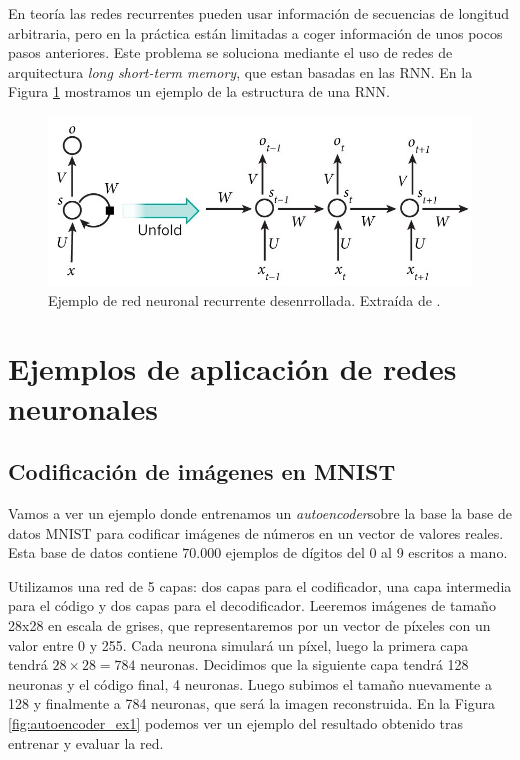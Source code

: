 \documentclass[
  a4paper,
  12pt,
  spanish,
]{scrartcl}
\theoremstyle{teorema-style}
\begin{document}
En teoría las redes recurrentes pueden usar información de secuencias de longitud arbitraria, pero en la práctica están limitadas a coger información de unos pocos pasos anteriores. Este problema se soluciona mediante el uso de redes de arquitectura \textit{long short-term memory}, que estan basadas en las RNN. En la Figura \ref{fig:rnn} mostramos un ejemplo de la estructura de una RNN.

\begin{figure}[h]
    \centering
    \includegraphics[width=0.7\linewidth]{img/rnn.jpeg}
    \caption{Ejemplo de red neuronal recurrente desenrrollada. Extraída de \parencite{nigam_understanding_2018}.}%
    \label{fig:rnn}
\end{figure}

\section{Ejemplos de aplicación de redes neuronales}
\label{sec:ejemplos}

\subsection{Codificación de imágenes en MNIST}

Vamos a ver un ejemplo donde entrenamos un \textit{autoencoder}\footnotemark sobre la base la base de datos MNIST \parencite{lecun_1998_gradient} para
codificar imágenes de números en un vector de valores reales. Esta base de datos contiene $70.000$ ejemplos de dígitos del 0 al 9 escritos a mano.


Utilizamos una red de 5 capas: dos capas para el codificador, una capa intermedia para el código y dos capas para el decodificador. Leeremos imágenes de tamaño 28x28 en escala de grises, que representaremos por un vector de píxeles con un valor entre 0 y 255. Cada neurona simulará un píxel, luego la primera capa tendrá $28 \times 28=784$ neuronas. Decidimos que la siguiente capa tendrá 128 neuronas y el código final, 4 neuronas. Luego subimos el tamaño nuevamente a 128 y finalmente a 784 neuronas, que será la imagen reconstruida. En la Figura \ref{fig:autoencoder_ex1} podemos ver un ejemplo del resultado obtenido tras entrenar y evaluar la red.
\end{document}

